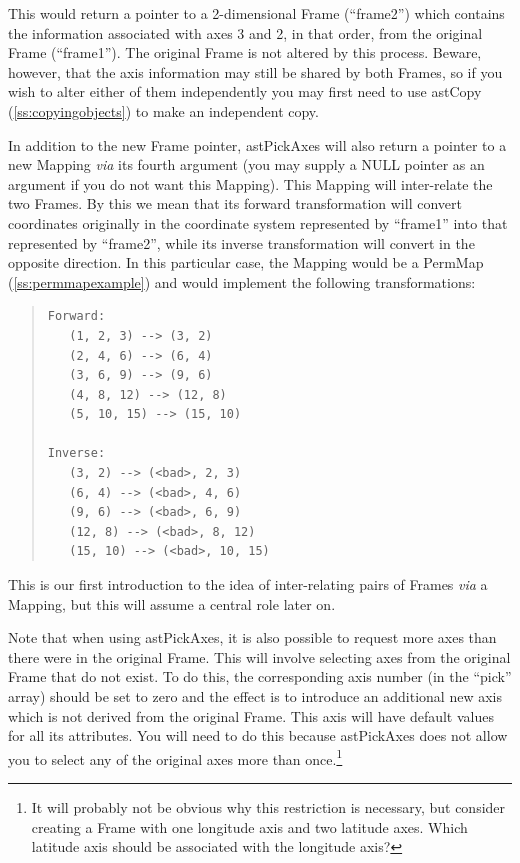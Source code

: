 \documentclass[twoside,11pt]{article}
\newcommand{\htmlref}[2]{#1}
\newcommand{\secref}[1]{\S\ref{#1}}
\renewcommand{\secref}[1]{\ref{#1}}
\begin{document}
This would return a pointer to a 2-dimensional Frame (``frame2'')
which contains the information associated with axes 3 and 2, in that
order, from the original Frame (``frame1''). The original Frame is not
altered by this process. Beware, however, that the axis information
may still be shared by both Frames, so if you wish to alter either of
them independently you may first need to use \htmlref{astCopy}{astCopy}
(\secref{ss:copyingobjects}) to make an independent copy.

In addition to the new Frame pointer, \htmlref{astPickAxes}{astPickAxes} will also return a
pointer to a new \htmlref{Mapping}{Mapping} {\em{via}} its fourth argument (you may supply a
NULL pointer as an argument if you do not want this Mapping).  This
Mapping will inter-relate the two Frames. By this we mean that its
forward transformation will convert coordinates originally in the
coordinate system represented by ``frame1'' into that represented by
``frame2'', while its inverse transformation will convert in the
opposite direction. In this particular case, the Mapping would be a
\htmlref{PermMap}{PermMap} (\secref{ss:permmapexample}) and would implement the following
transformations:

\begin{quote}
\begin{verbatim}
Forward:
   (1, 2, 3) --> (3, 2)
   (2, 4, 6) --> (6, 4)
   (3, 6, 9) --> (9, 6)
   (4, 8, 12) --> (12, 8)
   (5, 10, 15) --> (15, 10)

Inverse:
   (3, 2) --> (<bad>, 2, 3)
   (6, 4) --> (<bad>, 4, 6)
   (9, 6) --> (<bad>, 6, 9)
   (12, 8) --> (<bad>, 8, 12)
   (15, 10) --> (<bad>, 10, 15)
\end{verbatim}
\end{quote}

This is our first introduction to the idea of inter-relating pairs of
Frames {\em{via}} a Mapping, but this will assume a central role later on.

Note that when using astPickAxes, it is also possible to request more
axes than there were in the original Frame. This will involve
selecting axes from the original Frame that do not exist. To do this,
the corresponding axis number (in the ``pick'' array) should be set to
zero and the effect is to introduce an additional new axis which is
not derived from the original Frame. This axis will have default
values for all its attributes. You will need to do this because
astPickAxes does not allow you to select any of the original axes more
than once.\footnote{It will probably not be obvious why this
restriction is necessary, but consider creating a Frame with one
longitude axis and two latitude axes. Which latitude axis should be
associated with the longitude axis?}
\end{document}
